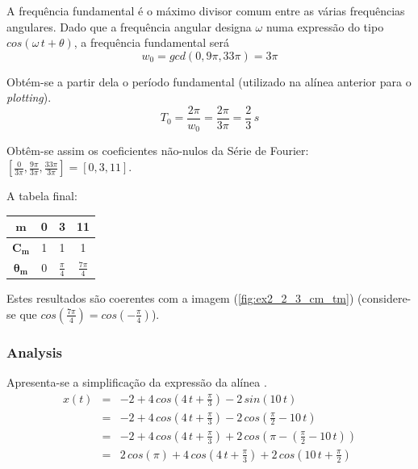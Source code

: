 \documentclass[a4paper]{article}
\begin{document}
\noindent A frequência fundamental é o máximo divisor comum entre as várias frequências angulares. Dado que a frequência angular designa $\omega$ numa expressão do tipo $cos(\omega \, t + \theta)$, a frequência fundamental será
\begin{equation}
	w_0 = gcd(0, 9 \pi, 33 \pi) = 3 \pi
\end{equation}

\noindent Obtém-se a partir dela o período fundamental (utilizado na alínea anterior para o \emph{plotting}).
\begin{equation}
	T_0 = \frac{2 \pi}{w_0} = \frac{2 \pi}{3 \pi} = \frac{2}{3} \, s
\end{equation}

\noindent Obtêm-se assim os coeficientes não-nulos da Série de Fourier: $\left[\frac{0}{3 \pi}, \frac{9 \pi}{3 \pi}, \frac{33 \pi}{3 \pi}\right] = [0, 3, 11]$.

\noindent A tabela final:

\begin{center}
	\begin{tabular}{|c|c|c|c|}
		\hline
		$\mathbf{m}$ & 0 & 3 & 11 \\
		\hline
		$\mathbf{C_m}$ & 1 & 1 & 1 \\
		\hline
		$\mathbf{\theta_m}$ & 0 & $\frac{\pi}{4}$ & $\frac{7 \pi}{4}$ \\
		\hline
	\end{tabular}
	\label{tab:ex_2_1_3}
\end{center}

\noindent Estes resultados são coerentes com a imagem (\ref{fig:ex2_2_3_cm_tm}) (considere-se que $cos\left(\frac{7 \pi}{4}\right) = cos\left(-\frac{\pi}{4}\right)$).

\subsubsection{ Analysis}
\noindent Apresenta-se a simplificação da expressão da alínea \emph{}.
\begin{eqnarray}
	x(t) & = & -2 + 4 \, cos\left(4 \, t + \frac{\pi}{3}\right) - 2 \, sin(10 \, t) \\
	& = & -2 + 4 \, cos\left(4 \, t + \frac{\pi}{3}\right) - 2 \, cos\left(\frac{\pi}{2} - 10 \, t\right) \\
	& = & -2 + 4 \, cos\left(4 \, t + \frac{\pi}{3}\right) + 2 \, cos\left(\pi - \left(\frac{\pi}{2} - 10 \, t\right)\right) \\
	& = & 2 \, cos(\pi) + 4 \, cos\left(4 \, t + \frac{\pi}{3}\right) + 2 \, cos\left(10 \, t + \frac{\pi}{2}\right)
\end{eqnarray}
\end{document}
